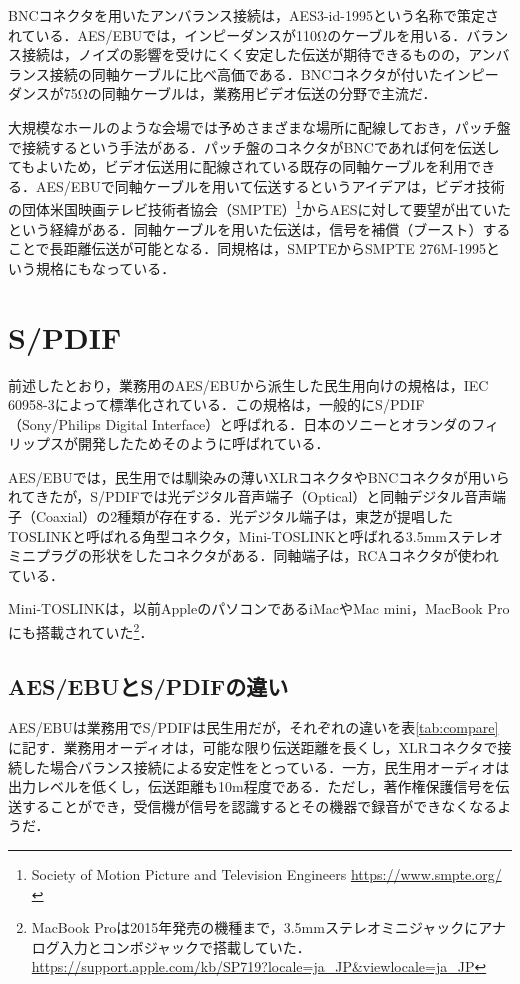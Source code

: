 BNCコネクタを用いたアンバランス接続は，AES3-id-1995という名称で策定されている．AES/EBUでは，インピーダンスが110Ωのケーブルを用いる．バランス接続は，ノイズの影響を受けにくく安定した伝送が期待できるものの，アンバランス接続の同軸ケーブルに比べ高価である．BNCコネクタが付いたインピーダンスが75Ωの同軸ケーブルは，業務用ビデオ伝送の分野で主流だ．

大規模なホールのような会場では予めさまざまな場所に配線しておき，パッチ盤で接続するという手法がある．パッチ盤のコネクタがBNCであれば何を伝送してもよいため，ビデオ伝送用に配線されている既存の同軸ケーブルを利用できる．AES/EBUで同軸ケーブルを用いて伝送するというアイデアは，ビデオ技術の団体米国映画テレビ技術者協会（SMPTE）\footnote{Society of Motion Picture and Television Engineers \url{https://www.smpte.org/}}からAESに対して要望が出ていたという経緯がある\cite{aes3id-1995-column}．同軸ケーブルを用いた伝送は，信号を補償（ブースト）することで長距離伝送が可能となる．同規格は，SMPTEからSMPTE 276M-1995という規格にもなっている．

\section{S/PDIF}

前述したとおり，業務用のAES/EBUから派生した民生用向けの規格は，IEC 60958-3によって標準化されている．この規格は，一般的にS/PDIF（Sony/Philips Digital Interface）と呼ばれる．日本のソニーとオランダのフィリップスが開発したためそのように呼ばれている．

AES/EBUでは，民生用では馴染みの薄いXLRコネクタやBNCコネクタが用いられてきたが，S/PDIFでは光デジタル音声端子（Optical）と同軸デジタル音声端子（Coaxial）の2種類が存在する．光デジタル端子は，東芝が提唱したTOSLINKと呼ばれる角型コネクタ，Mini-TOSLINKと呼ばれる3.5mmステレオミニプラグの形状をしたコネクタがある．同軸端子は，RCAコネクタが使われている．

Mini-TOSLINKは，以前AppleのパソコンであるiMacやMac mini，MacBook Proにも搭載されていた\footnote{MacBook Proは2015年発売の機種まで，3.5mmステレオミニジャックにアナログ入力とコンボジャックで搭載していた． \url{https://support.apple.com/kb/SP719?locale=ja_JP&viewlocale=ja_JP}}．

\subsection{AES/EBUとS/PDIFの違い}

AES/EBUは業務用でS/PDIFは民生用だが，それぞれの違いを表\ref{tab:compare}に記す．業務用オーディオは，可能な限り伝送距離を長くし，XLRコネクタで接続した場合バランス接続による安定性をとっている．一方，民生用オーディオは出力レベルを低くし，伝送距離も10m程度である．ただし，著作権保護信号を伝送することができ，受信機が信号を認識するとその機器で録音ができなくなるようだ．

